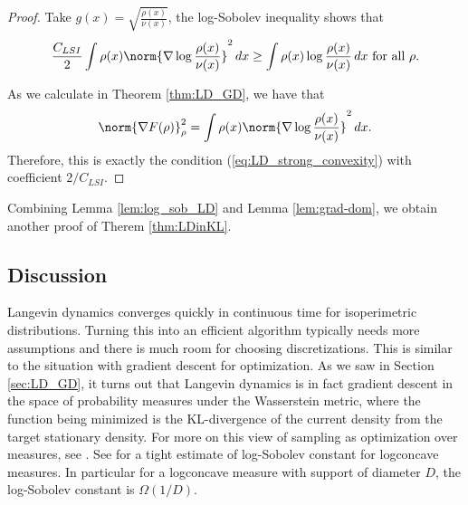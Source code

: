 \begin{proof}
Take $g(x)=\sqrt{\frac{\rho(x)}{\nu(x)}}$, the log-Sobolev inequality
shows that 
\[
\frac{C_{LSI}}{2}\int\rho(x)\norm{\nabla\log\frac{\rho(x)}{\nu(x)}}^{2}\,dx\geq\int\rho(x)\log\frac{\rho(x)}{\nu(x)}\,dx\text{ for all }\rho.
\]

As we calculate in Theorem \ref{thm:LD_GD}, we have that
\[
\norm{\nabla F(\rho)}_{\rho}^{2}=\int\rho(x)\norm{\nabla\log\frac{\rho(x)}{\nu(x)}}^{2}\,dx.
\]
Therefore, this is exactly the condition (\ref{eq:LD_strong_convexity})
with coefficient $2/C_{LSI}$.
\end{proof}
Combining Lemma \ref{lem:log_sob_LD} and Lemma \ref{lem:grad-dom},
we obtain another proof of Therem \ref{thm:LDinKL}.

\subsection{Discussion}

Langevin dynamics converges quickly in continuous time for isoperimetric
distributions. Turning this into an efficient algorithm typically
needs more assumptions and there is much room for choosing discretizations.
This is similar to the situation with gradient descent for optimization.
As we saw in Section \ref{sec:LD_GD}, it turns out that Langevin
dynamics is in fact gradient descent in the space of probability measures
under the Wasserstein metric, where the function being minimized is
the KL-divergence of the current density from the target stationary
density. For more on this view of sampling as optimization over measures,
see \cite{wibisono2018sampling}. See \cite{lee2024eldan} for a tight
estimate of log-Sobolev constant for logconcave measures. In particular
for a logconcave measure with support of diameter $D$, the log-Sobolev
constant is $\Omega(1/D)$.
